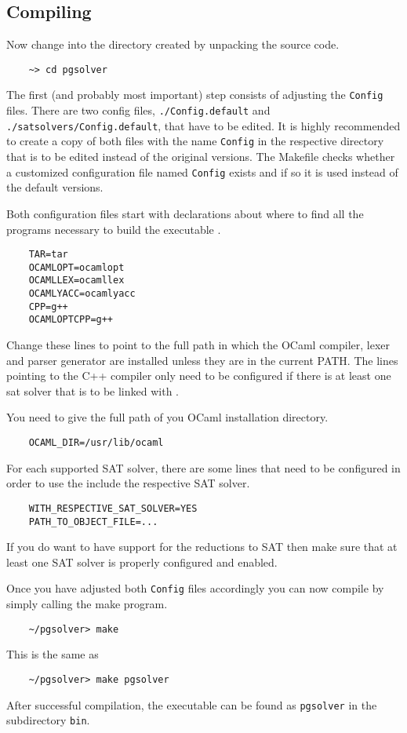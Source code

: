 \subsection{Compiling \pgsolver}

Now change into the directory created by unpacking the \pgsolver source code.
\begin{verbatim}
    ~> cd pgsolver
\end{verbatim}
The first (and probably most important) step consists of adjusting the \texttt{Config} files.
There are two config files, \texttt{./Config.default} and \texttt{./satsolvers/Config.default},
that have to be edited. It is highly recommended to create a copy of both files with the name \texttt{Config}
in the respective directory that is to be edited instead of the original versions. The Makefile
checks whether a customized configuration file named \texttt{Config} exists and if so it is used
instead of the default versions.

Both configuration files start with declarations about where to find all the programs necessary to build
the executable \pgsolver.
\begin{verbatim}
    TAR=tar
    OCAMLOPT=ocamlopt
    OCAMLLEX=ocamllex
    OCAMLYACC=ocamlyacc
    CPP=g++
    OCAMLOPTCPP=g++
\end{verbatim}
Change these lines to point to the full path in which the OCaml compiler, lexer and parser
generator are installed unless they are in the current PATH. The lines pointing to the C++
compiler only need to be configured if there is at least one sat solver that is to be linked
with \pgsolver.

You need to give the full path of you OCaml installation directory.
\begin{verbatim}
    OCAML_DIR=/usr/lib/ocaml
\end{verbatim}


For each supported SAT solver, there are some lines that need to be configured in order
to use the include the respective SAT solver.
\begin{verbatim}
    WITH_RESPECTIVE_SAT_SOLVER=YES
    PATH_TO_OBJECT_FILE=...
\end{verbatim}
If you do want to have support for the reductions to SAT then make sure that at least one
SAT solver is properly configured and enabled.

Once you have adjusted both \texttt{Config} files accordingly you can now compile \pgsolver
by simply calling the make program.
\begin{verbatim}
    ~/pgsolver> make
\end{verbatim}
This is the same as
\begin{verbatim}
    ~/pgsolver> make pgsolver
\end{verbatim}
After successful compilation, the executable can be found as \texttt{pgsolver} in the
subdirectory \texttt{bin}.

